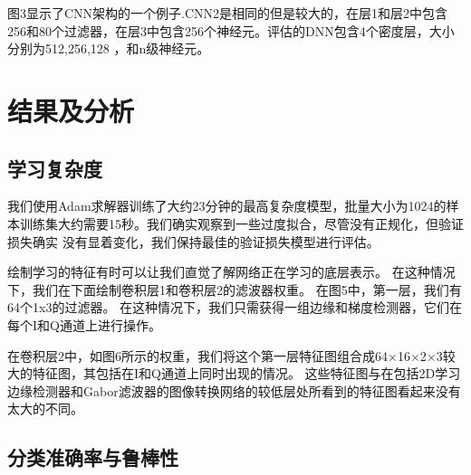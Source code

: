 图3显示了CNN架构的一个例子.CNN2是相同的但是较大的，在层1和层2中包含256和80个过滤器，在层3中包含256个神经元。评估的DNN包含4个密度层，大小分别为512,256,128 ，和n级神经元。\par

\section{结果及分析}

\subsection{学习复杂度}
我们使用Adam求解器训练了大约23分钟的最高复杂度模型，批量大小为1024的样本训练集大约需要15秒。我们确实观察到一些过度拟合，尽管没有正规化，但验证损失确实 没有显着变化，我们保持最佳的验证损失模型进行评估。\par

绘制学习的特征有时可以让我们直觉了解网络正在学习的底层表示。 在这种情况下，我们在下面绘制卷积层1和卷积层2的滤波器权重。 在图5中，第一层，我们有64个1x3的过滤器。 在这种情况下，我们只需获得一组边缘和梯度检测器，它们在每个I和Q通道上进行操作。\par

在卷积层2中，如图6所示的权重，我们将这个第一层特征图组合成64×16×2×3较大的特征图，其包括在I和Q通道上同时出现的情况。 这些特征图与在包括2D学习边缘检测器和Gabor滤波器的图像转换网络的较低层处所看到的特征图看起来没有太大的不同。\par

\subsection{分类准确率与鲁棒性}
